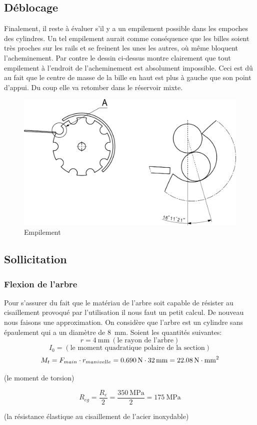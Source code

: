 \subsection{Déblocage}
Finalement, il reste à évaluer s'il y a un empilement possible dans les empoches des cylindres. Un tel empilement aurait comme conséquence que les billes soient très proches sur les rails et se freinent les unes les autres, où même bloquent l'acheminement. Par contre le dessin ci-dessus montre clairement que tout empilement à l'endroit de l'acheminement est absolument impossible. Ceci est dû au fait que le centre de masse de la bille en haut est plus à gauche que son point d'appui. Du coup elle va retomber dans le réservoir mixte.
\begin{figure}
    \centering
    \includegraphics[width=\textwidth]{Graphics/Dessins_justification_Leon/DESSIN_EMPILEMENT_FAUSSE_COTE.pdf}
    \caption{Empilement}
\end{figure}

\subsection{Sollicitation}
\subsubsection{Flexion de l'arbre}
Pour s'assurer du fait que le matériau de l'arbre soit capable de résister au cisaillement provoqué par l'utilisation il nous faut un petit calcul. De nouveau nous faisons une approximation. On considère que l'arbre est un cylindre sans épaulement qui a un diamètre de \SI{8}{\milli\metre}.
Soient les quantités suivantes:\\
\[r = \SI{4}{\milli\metre} \ (\text{le rayon de l'arbre})\]
\[I_{0} =  (\text{le moment quadratique polaire de la section}) \]
\[M_{t} =  \mit F_{main}\mit \cdot r_{manivelle} = \SI{0.690}{\N}\cdot\SI{32}{\milli\metre} = \SI{22.08}{\N\cdot mm^2} \]
\begin{center}
(le moment de torsion)
\end{center}
\[R_{eg} = \frac{R_{e}}{2} = \frac{\SI{350}{\mega\pascal}}{2} = \SI{175}{\mega\pascal}\]
\begin{center}
(la résistance élastique au cisaillement de l'acier inoxydable)   
\end{center}

